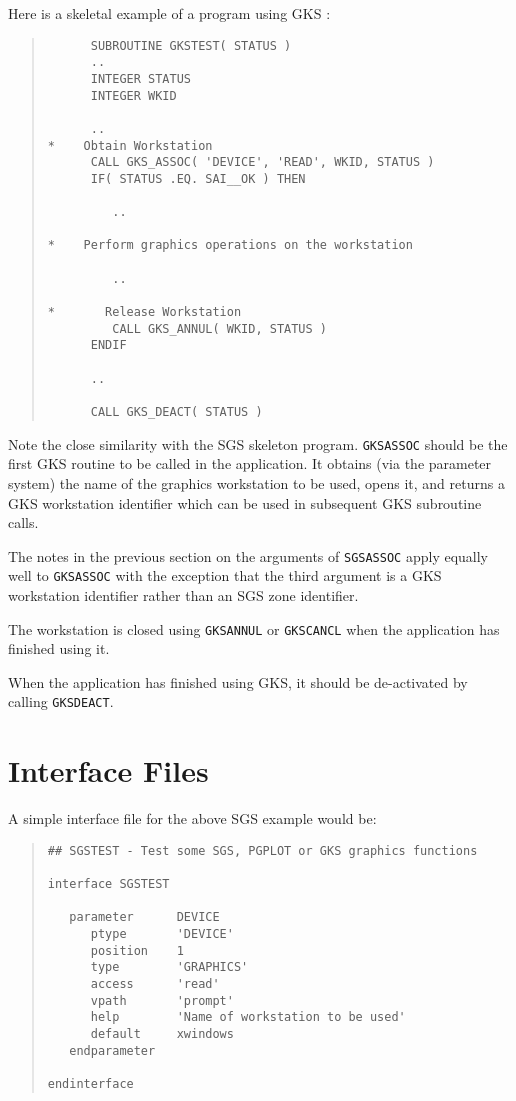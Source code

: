 \documentclass[twoside,11pt]{article}
\newcommand{\htmlref}[2]{#1}
\renewcommand{\_}{\texttt{\symbol{95}}}
\begin{document}
Here is a skeletal example of a program using GKS :
\begin{quote}
\begin{verbatim}
      SUBROUTINE GKSTEST( STATUS )
      ..
      INTEGER STATUS
      INTEGER WKID

      ..
*    Obtain Workstation
      CALL GKS_ASSOC( 'DEVICE', 'READ', WKID, STATUS )
      IF( STATUS .EQ. SAI__OK ) THEN

         ..

*    Perform graphics operations on the workstation

         ..

*       Release Workstation
         CALL GKS_ANNUL( WKID, STATUS )
      ENDIF

      ..

      CALL GKS_DEACT( STATUS )
\end{verbatim}
\end{quote}

Note the close similarity with the SGS skeleton program.
\htmlref{{\tt GKS\_ASSOC}}{GKS_ASSOC} should be
the first GKS routine to be called in the application. It obtains (via the
parameter system) the name of the graphics workstation to be used, opens it,
and returns a GKS workstation identifier which can be used in subsequent GKS
subroutine calls.

The notes in the previous section on the arguments of {\tt SGS\_ASSOC}
 apply equally
well to {\tt GKS\_ASSOC} with the exception that the third argument is a GKS
workstation identifier rather than an SGS zone identifier.

The workstation is closed using
\htmlref{{\tt GKS\_ANNUL}}{GKS_ANNUL} or
\htmlref{{\tt GKS\_CANCL}}{GKS_CANCL}
when the application has finished using it.

When the application has finished using GKS, it should be de-activated by
calling \htmlref{{\tt GKS\_DEACT}}{GKS_DEACT}.

\section{Interface Files}
\label{ifl}
A simple interface file for the above SGS example would be:
\begin{quote}
\begin{verbatim}
## SGSTEST - Test some SGS, PGPLOT or GKS graphics functions

interface SGSTEST

   parameter      DEVICE
      ptype       'DEVICE'
      position    1
      type        'GRAPHICS'
      access      'read'
      vpath       'prompt'
      help        'Name of workstation to be used'
      default     xwindows
   endparameter

endinterface
\end{verbatim}
\end{quote}
\end{document}
